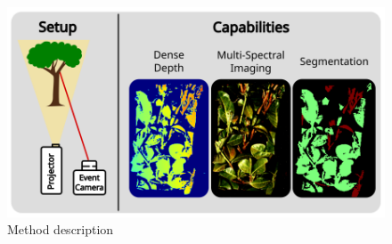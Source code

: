\begin{figure}[t!]
    \centering
    \includegraphics[width=.8 \textwidth]{resources/images/overview.png}
    \caption{Method description}
    \label{fig:method_overview}
\end{figure}